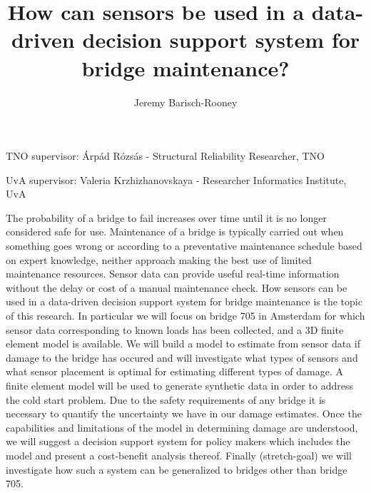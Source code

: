 \documentclass[11pt]{article}
\author{Jeremy Barisch-Rooney}
\date{}
\title{How can sensors be used in a data-driven decision support system for bridge maintenance?}
\begin{document}
\maketitle
\setlength{\droptitle}{-3cm}

TNO supervisor: Árpád Rózsás - Structural Reliability Researcher, TNO

UvA supervisor: Valeria Krzhizhanovskaya - Researcher Informatics Institute, UvA

The probability of a bridge to fail increases over time until it is no longer
considered safe for use. Maintenance of a bridge is typically carried out
when something goes wrong or according to a preventative maintenance schedule
based on expert knowledge, neither approach making the best use of limited
maintenance resources. Sensor data can provide useful real-time information
without the delay or cost of a manual maintenance check. How sensors can be
used in a data-driven decision support system for bridge maintenance is the
topic of this research. In particular we will focus on bridge 705 in
Amsterdam for which sensor data corresponding to known loads has been
collected, and a 3D finite element model is available. We will build a model
to estimate from sensor data if damage to the bridge has occured and will
investigate what types of sensors and what sensor placement is optimal for
estimating different types of damage. A finite element model will be used to
generate synthetic data in order to address the cold start problem. Due to
the safety requirements of any bridge it is necessary to quantify the
uncertainty we have in our damage estimates. Once the capabilities and
limitations of the model in determining damage are understood, we will
suggest a decision support system for policy makers which includes the model
and present a cost-benefit analysis thereof. Finally (stretch-goal) we will
investigate how such a system can be generalized to bridges other than
bridge 705.
\end{document}
